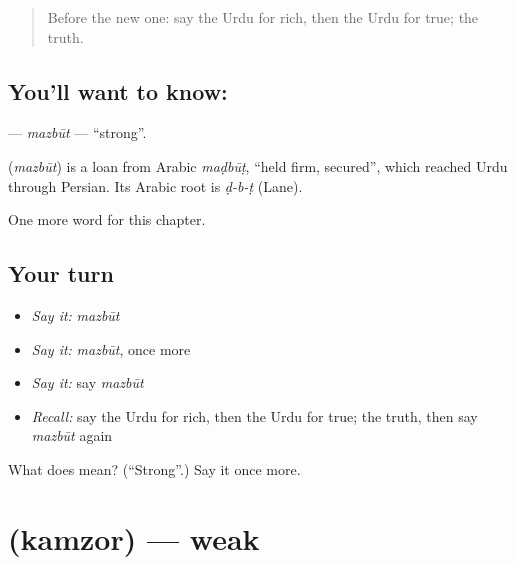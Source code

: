 \label{lesson:UR-C132-mazbut}



\begin{quote}
Before the new one: say the Urdu for rich, then the Urdu for true; the truth.
\end{quote}

\subsection*{You'll want to know: }
\textbf{} — \emph{mazbūt} — \textquotedblleft{}strong\textquotedblright{}.

\begin{cousinweb}
\textbf{} (\emph{mazbūt}) is a loan from Arabic \emph{maḍbūṭ}, \textquotedblleft{}held firm, secured\textquotedblright{}, which reached Urdu through Persian. Its Arabic root is \emph{ḍ-b-ṭ} (Lane).
\end{cousinweb}

\begin{grammarlens}[title={What you've built}]
One more word for this chapter.
\end{grammarlens}

\subsection*{Your turn}
\begin{itemize}
\raggedright
  \item \emph{Say it:} \emph{mazbūt}
  \item \emph{Say it:} \emph{mazbūt}, once more
  \item \emph{Say it:} say \emph{mazbūt}
  \item \emph{Recall:} say the Urdu for rich, then the Urdu for true; the truth, then say \emph{mazbūt} again
\end{itemize}

\begin{tcolorbox}[breakable,colback=teal!4,colframe=teal!35!black,title={Before you move on}]
What does  mean? (\textquotedblleft{}Strong\textquotedblright{}.) Say it once more.
\end{tcolorbox}
\section[\texorpdfstring{\ur{کمزور} (kamzor)}{کمزور (kamzor)}]{ (kamzor) — weak}

\label{lesson:UR-C132-kamzor}



